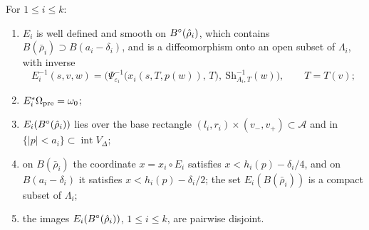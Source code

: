 \begin{proposition}\label{prop:str-layer}
For $1\le i\le k$:
\begin{enumerate}[label=(\roman*)]
\item $E_i$ is well defined and smooth on $B^{\circ}(\hat\rho_i)$, which contains $B(\bar\rho_i)\supset B(a_i-\delta_i)$, and is a
diffeomorphism onto an open subset of $\Lambda_i$, with inverse
\[
 E_i^{-1}(s,v,w)=\Big(\Psi_{\varepsilon_i}^{-1}\big(x_i(s,T,p(w)),\,T\big),\ \mathrm{Sh}_{A_i,T}^{-1}(w)\Big),\qquad T=T(v);
\]
\item $E_i^*\Omega_{\rm pre}=\omega_0$;
\item $E_i(B^{\circ}(\hat\rho_i))$ lies over the base rectangle $(l_i,r_i)\times(v_-,v_+)\subset\mathcal A$ and in
$\{|p|<a_i\}\subset\operatorname{int}V_\Delta$;
\item on $B(\bar\rho_i)$ the coordinate $x=x_i\circ E_i$ satisfies $x<h_i(p)-\delta_i/4$, and on $B(a_i-\delta_i)$ it satisfies
$x<h_i(p)-\delta_i/2$; the set $E_i(B(\bar\rho_i))$ is a compact subset of $\Lambda_i$;
\item the images $E_i(B^{\circ}(\hat\rho_i))$, $1\le i\le k$, are pairwise disjoint.
\end{enumerate}
\end{proposition}

